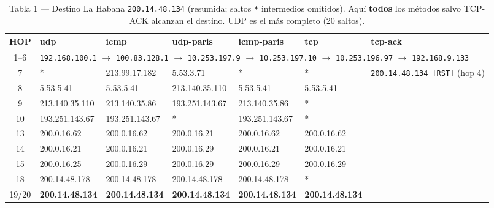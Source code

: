\documentclass[11pt,a4paper]{article}
\newcommand{\ip}[1]{\texttt{#1}}
\begin{document}
\begin{landscape}
\begin{table}[H]
\centering\scriptsize
\begin{tabular}{c|llllll}
\toprule
HOP & udp & icmp & udp-paris & icmp-paris & tcp & tcp-ack \\
\midrule
1--6 & \multicolumn{6}{l}{\ip{192.168.100.1} $\to$ \ip{100.83.128.1} $\to$ \ip{10.253.197.9} $\to$ \ip{10.253.197.10} $\to$ \ip{10.253.196.97} $\to$ \ip{192.168.9.133}} \\
7 & * & 213.99.17.182 & 5.53.3.71 & * & * & \ip{200.14.48.134 [RST]} (hop 4) \\
8 & 5.53.5.41 & 5.53.5.41 & 213.140.35.110 & 5.53.5.41 & 5.53.5.41 & \\
9 & 213.140.35.110 & 213.140.35.86 & 193.251.143.67 & 213.140.35.86 & * & \\
10 & 193.251.143.67 & 193.251.143.67 & * & 193.251.143.67 & * & \\
13 & 200.0.16.62 & 200.0.16.62 & 200.0.16.21 & 200.0.16.62 & 200.0.16.62 & \\
14 & 200.0.16.21 & 200.0.16.21 & 200.0.16.29 & 200.0.16.21 & 200.0.16.21 & \\
15 & 200.0.16.25 & 200.0.16.29 & 200.0.16.29 & 200.0.16.29 & 200.0.16.29 & \\
18 & 200.14.48.178 & 200.14.48.178 & 200.14.48.178 & 200.14.48.178 & * & \\
19/20 & \textbf{200.14.48.134} & \textbf{200.14.48.134} & \textbf{200.14.48.134} & \textbf{200.14.48.134} & \textbf{200.14.48.134} & \\
\bottomrule
\end{tabular}
\caption{Tabla 1 --- Destino La Habana \ip{200.14.48.134} (resumida; saltos \ip{*} intermedios
omitidos). Aquí \textbf{todos} los métodos salvo TCP-ACK alcanzan el destino. UDP es el más
completo (20 saltos).}
\end{table}


\end{landscape}
\end{document}
